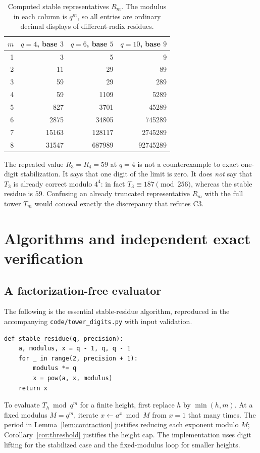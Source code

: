 \documentclass[11pt,a4paper]{article}
\numberwithin{equation}{section}
\theoremstyle{plain}
\theoremstyle{definition}
\begin{document}
\begin{table}[ht]
\centering
\caption{Computed stable representatives $R_m$. The modulus in each column is
$q^m$, so all entries are ordinary decimal displays of different-radix residues.}
\label{tab:residues}
\begin{tabular}{r r r r}
\toprule
$m$ & $q=4$, base $3$ & $q=6$, base $5$ & $q=10$, base $9$\\
\midrule
1&3&5&9\\
2&11&29&89\\
3&59&29&289\\
4&59&1109&5289\\
5&827&3701&45289\\
6&2875&34805&745289\\
7&15163&128117&2745289\\
8&31547&687989&92745289\\
\bottomrule
\end{tabular}
\end{table}

The repeated value $R_3=R_4=59$ at $q=4$ is not a counterexample to
exact one-digit stabilization.  It says that one digit of the limit is
zero.  It does \emph{not} say that $T_3$ is already correct modulo $4^4$:
in fact $T_3\equiv187\pmod{256}$, whereas the stable residue is $59$.
Confusing an already truncated representative $R_m$ with the full tower
$T_m$ would conceal exactly the discrepancy that refutes C3.

\section{Algorithms and independent exact verification}\label{sec:algorithms}

\subsection{A factorization-free evaluator}
The following is the essential stable-residue algorithm, reproduced in
the accompanying \texttt{code/tower\_digits.py} with input validation.
\begin{lstlisting}
def stable_residue(q, precision):
    a, modulus, x = q - 1, q, q - 1
    for _ in range(2, precision + 1):
        modulus *= q
        x = pow(a, x, modulus)
    return x
\end{lstlisting}

To evaluate $T_h\bmod q^m$ for a finite height, first replace $h$ by
$\min(h,m)$.  At a fixed modulus $M=q^m$, iterate
$x\leftarrow a^x\bmod M$ from $x=1$ that many times.
The period in Lemma~\ref{lem:contraction} justifies reducing each exponent
modulo $M$; Corollary~\ref{cor:threshold} justifies the height cap.
The implementation uses digit lifting for the stabilized case and the
fixed-modulus loop for smaller heights.
\end{document}
